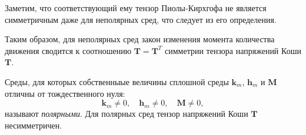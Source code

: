 Заметим, что соответствующий ему тензор Пиолы-Кирхгофа не является симметричным даже для неполярных сред, что следует из его определения. 

Таким образом, для неполярных сред закон изменения момента количества движения сводится к соотношению $\mathbf{T} = \mathbf{T}^{T}$ симметрии тензора напряжений Коши $\mathbf{T}$.

Среды, для которых собственныые величины сплошной среды $\mathbf{k}_m$, $\mathbf{h}_m$ и $\mathbf{M}$ отличны от тождественного нуля:
\begin{equation*}
	\mathbf{k}_m \not = 0, \quad \mathbf{h}_m \not = 0, \quad \mathbf{M} \not = 0,
\end{equation*}
называют \textit{полярными}. Для полярных сред тензор напряжений Коши $\mathbf{T}$ несимметричен. 